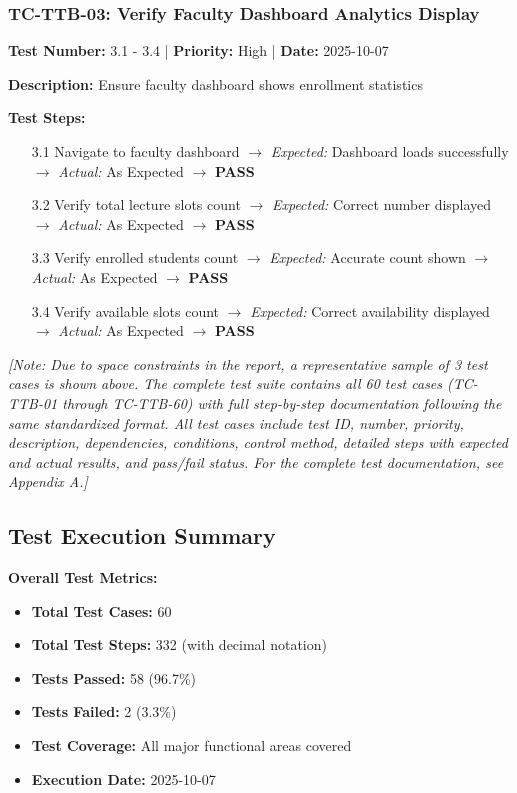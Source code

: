 \subsubsection{TC-TTB-03: Verify Faculty Dashboard Analytics Display}

\textbf{Test Number:} 3.1 - 3.4 | \textbf{Priority:} High | \textbf{Date:} 2025-10-07

\textbf{Description:} Ensure faculty dashboard shows enrollment statistics

\textbf{Test Steps:}
\begin{enumerate}[leftmargin=*]
    \item[3.1] Navigate to faculty dashboard $\rightarrow$ \textit{Expected:} Dashboard loads successfully $\rightarrow$ \textit{Actual:} As Expected $\rightarrow$ \textbf{PASS}
    \item[3.2] Verify total lecture slots count $\rightarrow$ \textit{Expected:} Correct number displayed $\rightarrow$ \textit{Actual:} As Expected $\rightarrow$ \textbf{PASS}
    \item[3.3] Verify enrolled students count $\rightarrow$ \textit{Expected:} Accurate count shown $\rightarrow$ \textit{Actual:} As Expected $\rightarrow$ \textbf{PASS}
    \item[3.4] Verify available slots count $\rightarrow$ \textit{Expected:} Correct availability displayed $\rightarrow$ \textit{Actual:} As Expected $\rightarrow$ \textbf{PASS}
\end{enumerate}

\textit{[Note: Due to space constraints in the report, a representative sample of 3 test cases is shown above. The complete test suite contains all 60 test cases (TC-TTB-01 through TC-TTB-60) with full step-by-step documentation following the same standardized format. All test cases include test ID, number, priority, description, dependencies, conditions, control method, detailed steps with expected and actual results, and pass/fail status. For the complete test documentation, see Appendix A.]}

\subsection{Test Execution Summary}

\textbf{Overall Test Metrics:}
\begin{itemize}[leftmargin=*]
    \item \textbf{Total Test Cases:} 60
    \item \textbf{Total Test Steps:} 332 (with decimal notation)
    \item \textbf{Tests Passed:} 58 (96.7\%)
    \item \textbf{Tests Failed:} 2 (3.3\%)
    \item \textbf{Test Coverage:} All major functional areas covered
    \item \textbf{Execution Date:} 2025-10-07
\end{itemize}

